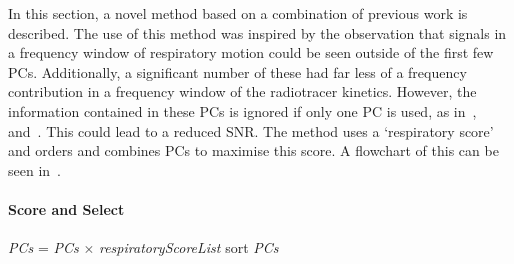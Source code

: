                 In this section, a novel method based on a combination of previous work is described. The use of this method was inspired by the observation that signals in a frequency window of respiratory motion could be seen outside of the first few \glspl{PC}. Additionally, a significant number of these had far less of a frequency contribution in a frequency window of the radiotracer kinetics. However, the information contained in these \glspl{PC} is ignored if only one \gls{PC} is used, as in~\parencite{Thielemans2011}, and~\parencite{Bertolli2018Data-DrivenTomography}. This could lead to a reduced \gls{SNR}. The method uses a `respiratory score' and orders and combines \glspl{PC} to maximise this score. A flowchart of this can be seen in~.
                    
                \paragraph{Score and Select} \label{sec:pca_data_driven_surrogate_signal_extraction_methods_for_dynamic_pet_methods_score_select_and_combine_method_score_and_select}
                    \begin{algorithm}
                        \caption{Score and Select \glspl{PC}}
                        \;
                        \;
                        \textit{PCs} = \textit{PCs} $\times$ \textit{respiratoryScoreList}\;
                        sort \textit{PCs}\;
                        \;
        
                        \label{alg:pca_data_driven_surrogate_signal_extraction_methods_for_dynamic_pet_methods_score_select_and_combine_method_score_and_select_score_and_select_pseudo_code}
                    \end{algorithm}
        
